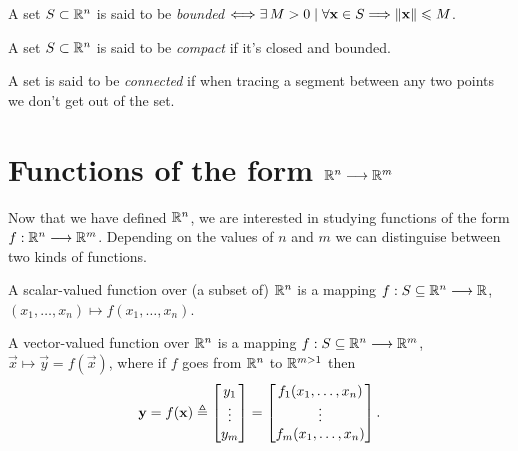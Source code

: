 \begin{defn}
A set $S\subset\Rtn$ is said to be \textit{bounded} $\iff\exists M > 0\st\forall\vec{x}\in S\implies \vnorm{\vec{x}}\leq M$.
\end{defn}

\begin{defn}
A set $S\subset\Rtn$ is said to be \textit{compact} if it's closed and bounded.
\end{defn}

\begin{defn}
A set is said to be \textit{connected} if when tracing a segment between any two points we don't get out of the set.
\end{defn}


\section{Functions of the form $\Rtn\longrightarrow\R^m$}
Now that we have defined $\Rtn$, we are interested in studying functions of the form $\stdvf$. Depending on the values of 
$n$ and $m$ we can distinguise between two kinds of functions.

\begin{defn}\label{def:scalar-function}
	A scalar-valued function over (a subset of) $\Rtn$ is a mapping $\appl{f}{S\subseteq\Rtn}{\R}$, $\left(x_1, \ldots, x_n\right)
	\longmapsto f\left(x_1, \ldots, x_n\right)$.
\end{defn}

\begin{defn}
	A vector-valued function over $\Rtn$ is a mapping $\appl{f}{S\subseteq\Rtn}{\R^m}$, $\vec{x}\longmapsto\vec{y} = f(\vec{x})$, where
	if $f$ goes from $\Rtn$ to $\R^{m>1}$ then
	\begin{equation}
		\mathbf{y} = f(\mathbf{x})\triangleq\begin{bmatrix}y_1 \\ \vdots \\ y_m \end{bmatrix} = \begin{bmatrix}f_1(x_1, \ldots, x_n) \\
		\vdots \\ f_m(x_1, \ldots, x_n)\end{bmatrix}.
	\end{equation}
\end{defn}

